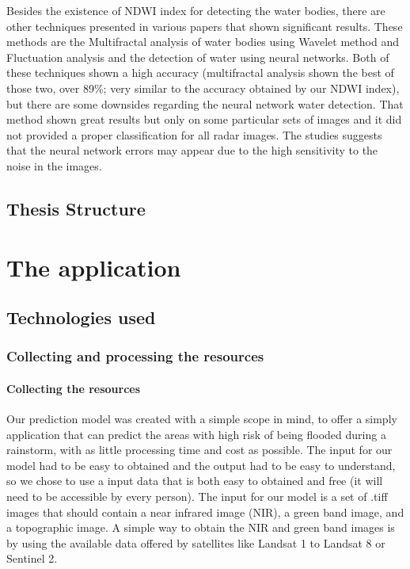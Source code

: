 \documentclass[12pt, a4paper]{report}
\begin{document}
Besides the existence of NDWI index for detecting the water bodies, there are other techniques presented in various papers \cite{Multifractal water analysis, NDWI Comparison} that shown significant results. These methods are the Multifractal analysis of water bodies using Wavelet method and Fluctuation analysis and the detection of water using neural networks. Both of these techniques shown a high accuracy (multifractal analysis shown the best of those two, over 89\%; very similar to the accuracy obtained by our NDWI index), but there are some downsides regarding the neural network water detection. That method shown great results but only on some particular sets of images and it did not provided a proper classification for all radar images. The studies \cite{NDWI Comparison} suggests that the neural network errors may appear due to the high sensitivity to the noise in the images. 



\section{Thesis Structure}



\newpage{}


\chapter{The application}

\section{Technologies used}

\subsection{Collecting and processing the resources}

\subsubsection{Collecting the resources}

\quad
Our prediction model was created with a simple scope in mind, to offer a simply  application that can predict the areas with high risk of being flooded during a rainstorm, with as little processing time and cost as possible. The input for our model had to be easy to obtained and the output had to be easy to understand, so we chose to use a input data that is both easy to obtained and free (it will need to be accessible by every person). The input for our model is a set of .tiff images that should contain a near infrared image (NIR), a green band image, and a topographic image. A simple way to obtain the NIR and green band images is by using the available data offered by satellites like Landsat 1 to Landsat 8 or Sentinel 2. 
\end{document}
